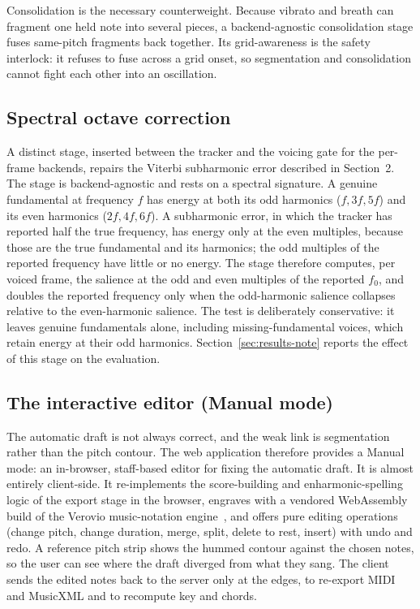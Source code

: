 \documentclass[12pt,a4paper]{article}
\begin{document}
Consolidation is the necessary counterweight. Because vibrato and breath can
fragment one held note into several pieces, a backend-agnostic consolidation
stage fuses same-pitch fragments back together. Its grid-awareness is the safety
interlock: it refuses to fuse across a grid onset, so segmentation and
consolidation cannot fight each other into an oscillation.

\subsection{Spectral octave correction}
\label{sec:octave}

A distinct stage, inserted between the tracker and the voicing gate for the
per-frame backends, repairs the Viterbi subharmonic error described in
Section~2. The stage is backend-agnostic and rests on a spectral signature. A
genuine fundamental at frequency $f$ has energy at both its odd harmonics
($f, 3f, 5f$) and its even harmonics ($2f, 4f, 6f$). A subharmonic error, in
which the tracker has reported half the true frequency, has energy only at the
even multiples, because those are the true fundamental and its harmonics; the
odd multiples of the reported frequency have little or no energy. The stage
therefore computes, per voiced frame, the salience at the odd and even
multiples of the reported $f_0$, and doubles the reported frequency only when
the odd-harmonic salience collapses relative to the even-harmonic salience. The
test is deliberately conservative: it leaves genuine fundamentals alone,
including missing-fundamental voices, which retain energy at their odd
harmonics. Section~\ref{sec:results-note} reports the effect of this stage on
the evaluation.

\subsection{The interactive editor (Manual mode)}

The automatic draft is not always correct, and the weak link is segmentation
rather than the pitch contour. The web application therefore provides a Manual
mode: an in-browser, staff-based editor for fixing the automatic draft. It is
almost entirely client-side. It re-implements the score-building and
enharmonic-spelling logic of the export stage in the browser, engraves with a
vendored WebAssembly build of the Verovio music-notation
engine~\cite{verovio}, and offers pure editing operations (change pitch, change
duration, merge, split, delete to rest, insert) with undo and redo. A reference
pitch strip shows the hummed contour against the chosen notes, so the user can
see where the draft diverged from what they sang. The client sends the edited
notes back to the server only at the edges, to re-export MIDI and MusicXML and
to recompute key and chords.
\end{document}
